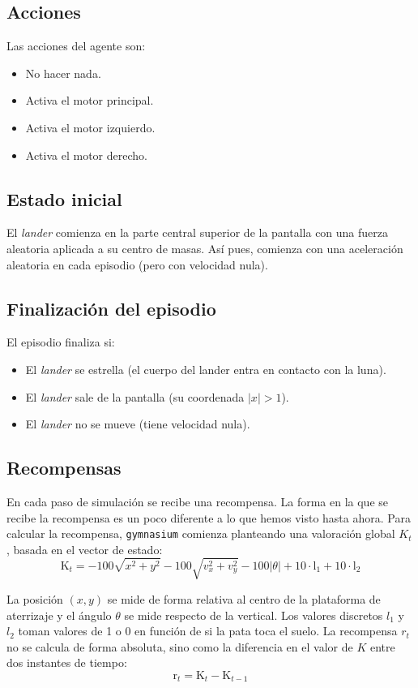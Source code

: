 \documentclass{article}
\begin{document}
\subsection{Acciones}
Las acciones del agente son:
\begin{itemize}
    \item[ 1.] No hacer nada.
    \item[2.] Activa el motor principal.
  \item[3.] Activa el motor izquierdo.
  \item[4.] Activa el motor derecho.
\end{itemize}

 
\subsection{Estado inicial}
El \textit{lander} comienza en la parte central superior de la pantalla con una fuerza aleatoria aplicada a su centro de masas. Así pues, comienza con una aceleración aleatoria en cada episodio (pero con velocidad nula).

\subsection{Finalización del episodio}
El episodio finaliza si:
\begin{itemize}
    \item El \textit{lander} se estrella (el cuerpo del lander entra en contacto con la luna).
    \item El \textit{lander} sale de la pantalla (su coordenada $|x|>1$).
    \item El \textit{lander} no se mueve (tiene velocidad nula).
\end{itemize}



\subsection{Recompensas}
En cada paso de simulación se recibe una recompensa. La forma en la que se recibe la recompensa es un poco diferente a lo que hemos visto hasta ahora. Para calcular la recompensa, \texttt{gymnasium} comienza planteando una valoración global $K_t$, basada en el vector de estado:
$$\text{K}_t = -100 \sqrt{x^2 + y^2} - 100 \sqrt{v_x^2 + v_y^2} - 100 \vert{}\theta\vert{} + 10 \cdot \text{l}_1 + 10 \cdot \text{l}_2$$

La posición $(x, y)$ se mide de forma relativa al centro de la plataforma de aterrizaje y el ángulo $\theta$ se mide respecto de la vertical. Los valores discretos $l_1$ y $l_2$ toman valores de 1 o 0 en función de si la pata toca el suelo.  La recompensa $r_t$ no se calcula de forma absoluta, sino como la diferencia en el valor de $K$ entre dos instantes de tiempo:
\begin{equation*}
\text{r}_t = \text{K}_t - \text{K}_{t-1} 
\end{equation*}
\end{document}
